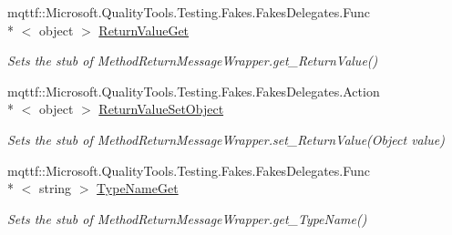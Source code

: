 \begin{DoxyCompactItemize}
mqttf\-::\-Microsoft.\-Quality\-Tools.\-Testing.\-Fakes.\-Fakes\-Delegates.\-Func\\*
$<$ object $>$ \hyperlink{class_system_1_1_runtime_1_1_remoting_1_1_messaging_1_1_fakes_1_1_stub_method_return_message_wrapper_ace457bb920bc766d63a7882363c7eb90}{Return\-Value\-Get}
\begin{DoxyCompactList}\small\item\em Sets the stub of Method\-Return\-Message\-Wrapper.\-get\-\_\-\-Return\-Value()\end{DoxyCompactList}\item 
mqttf\-::\-Microsoft.\-Quality\-Tools.\-Testing.\-Fakes.\-Fakes\-Delegates.\-Action\\*
$<$ object $>$ \hyperlink{class_system_1_1_runtime_1_1_remoting_1_1_messaging_1_1_fakes_1_1_stub_method_return_message_wrapper_a2378b9f760bc556c4962c8ca6992ff78}{Return\-Value\-Set\-Object}
\begin{DoxyCompactList}\small\item\em Sets the stub of Method\-Return\-Message\-Wrapper.\-set\-\_\-\-Return\-Value(\-Object value)\end{DoxyCompactList}\item 
mqttf\-::\-Microsoft.\-Quality\-Tools.\-Testing.\-Fakes.\-Fakes\-Delegates.\-Func\\*
$<$ string $>$ \hyperlink{class_system_1_1_runtime_1_1_remoting_1_1_messaging_1_1_fakes_1_1_stub_method_return_message_wrapper_ad4c8584dcc279c2a674681bdc723632c}{Type\-Name\-Get}
\begin{DoxyCompactList}\small\item\em Sets the stub of Method\-Return\-Message\-Wrapper.\-get\-\_\-\-Type\-Name()\end{DoxyCompactList}\end{DoxyCompactItemize}
